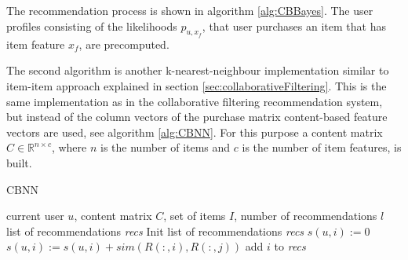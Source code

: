 \documentclass[10pt]{reportMaster}
\begin{document}
The recommendation process is shown in algorithm \ref{alg:CBBayes}.
The user profiles consisting of the likelihoods $p_{u, x_f}$, that user purchases an item that has item feature $x_f$, are precomputed.

The second algorithm is another k-nearest-neighbour implementation similar to item-item approach explained in section \ref{sec:collaborativeFiltering}.
This is the same implementation as in the collaborative filtering recommendation system, but instead of the column vectors of the purchase matrix content-based feature vectors are used, see algorithm \ref{alg:CBNN}.
For this purpose a content matrix $C \in \mathds{R}^{n \times c}$, where $n$ is the number of items and $c$ is the number of item features, is built.


\begin{algorithm}
	\caption[CBNN]{CBNN}
	\label{alg:CBNN}
	\begin{algorithmic}[1]
		\Require current user $u$, content matrix $C$, set of items $I$, number of recommendations $l$
		\Ensure list of recommendations \textit{recs}
		\State Init list of recommendations \textit{recs}
			\State $s(u,i) := 0$
				\State $s(u,i) := s(u,i) + sim(R(:,i), R(:,j))$
			\EndFor
				\State add $i$ to \textit{recs}
			\EndIf
		\EndFor
	\end{algorithmic}	
\end{algorithm}

 
%
%
\end{document}

